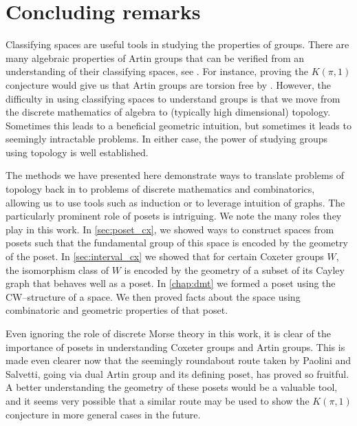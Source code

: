 \documentclass[class=article, crop=false]{standalone}
\begin{document}
\section{Concluding remarks}

Classifying spaces are useful tools in studying the properties of groups. There are many algebraic properties of Artin groups that can be verified from an understanding of their classifying spaces, see \cite{charney_problems_2008}. For instance, proving the $K(\pi,1)$ conjecture would give us that Artin groups are torsion free by \cite[Proposition 2.45]{hatcher_algebraic_2001}. However, the difficulty in using classifying spaces to understand groups is that we move from the discrete mathematics of algebra to (typically high dimensional) topology. Sometimes this leads to a beneficial geometric intuition, but sometimes it leads to seemingly intractable problems. In either case, the power of studying groups using topology is well established.

The methods we have presented here demonstrate ways to translate problems of topology back in to problems of discrete mathematics and combinatorics, allowing us to use tools such as induction or to leverage intuition of graphs. 
The particularly prominent role of posets is intriguing. We note the many roles they play in this work. In \cref{sec:poset_cx}, we showed ways to construct spaces from posets such that the fundamental group of this space is encoded by the geometry of the poset. In \cref{sec:interval_cx} we showed that for certain Coxeter groups $W$, the isomorphism class of $W$ is encoded by the geometry of a subset of its Cayley graph that behaves well as a poset. In \cref{chap:dmt} we formed a poset using the CW--structure of a space. We then proved facts about the space using combinatoric and geometric properties of that poset.

Even ignoring the role of discrete Morse theory in this work, it is clear of the importance of posets in understanding Coxeter groups and Artin groups. This is made even clearer now that the seemingly roundabout route taken by Paolini and Salvetti, going via dual Artin group and its defining poset, has proved so fruitful. A better understanding the geometry of these posets would be a valuable tool, and it seems very possible that a similar route may be used to show the $K(\pi,1)$ conjecture in more general cases in the future.
\end{document}

